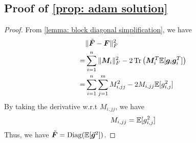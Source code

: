 \subsection{Proof of \cref{prop: adam solution}}
\label{subapp: proof of adam}
\begin{proof}
    From \cref{lemma: block diagonal simplification}, we have
    \begin{align*}
        &\Vert\tilde{\bm{F}}-{\bm{F}}\Vert_F^2\\
        =& \sum_{i=1}^n \Vert{\bm{M}}_i\Vert_F^2 - 2\operatorname{Tr}\left({\bm{M}}_i^T\mathbb{E}[{\bm{g}}_i{\bm{g}}_i^T]\right)\\
        =& \sum_{i=1}^n\sum_{j=1}^m M_{i,jj}^2 - 2M_{i,jj}\mathbb{E}[g_{i,j}^2]
    \end{align*}
    By taking the derivative w.r.t $M_{i,jj}$, we have
    \begin{align*}
        M_{i,jj} = \mathbb{E}[g_{i,j}^2]
    \end{align*}
    Thus, we have $\tilde{\bm{F}} = \operatorname{Diag}(\mathbb{E}[\vec{\bm{g}}^2])$.
\end{proof}
